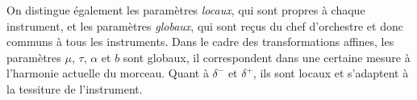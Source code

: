 On distingue également les paramètres \emph{locaux}, qui sont propres à chaque instrument, et les paramètres \emph{globaux}, qui sont reçus du chef d'orchestre et donc communs à tous les instruments. Dans le cadre des transformations affines, les paramètres $\mu$, $\tau$, $\alpha$  et $b$ sont globaux, il correspondent dans une certaine mesure à l'harmonie actuelle du morceau. Quant à $\delta^-$ et $\delta^+$, ils sont locaux et s'adaptent à la tessiture de l'instrument.

